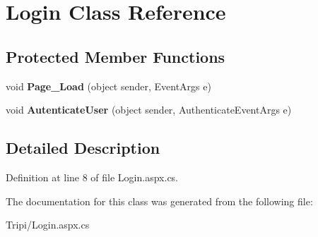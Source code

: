 \hypertarget{class_login}{
\section{Login Class Reference}
\label{class_login}
}
\subsection*{Protected Member Functions}
\begin{DoxyCompactItemize}
\item 
\hypertarget{class_login_a127860753dc4a7304cc5278d7b39af1d}{
void {\bfseries Page\_\-Load} (object sender, EventArgs e)}
\label{class_login_a127860753dc4a7304cc5278d7b39af1d}

\item 
\hypertarget{class_login_aca223b96d333691c4197e0e0a64338a2}{
void {\bfseries AutenticateUser} (object sender, AuthenticateEventArgs e)}
\label{class_login_aca223b96d333691c4197e0e0a64338a2}

\end{DoxyCompactItemize}


\subsection{Detailed Description}


Definition at line 8 of file Login.aspx.cs.

The documentation for this class was generated from the following file:\begin{DoxyCompactItemize}
\item 
Tripi/Login.aspx.cs\end{DoxyCompactItemize}
